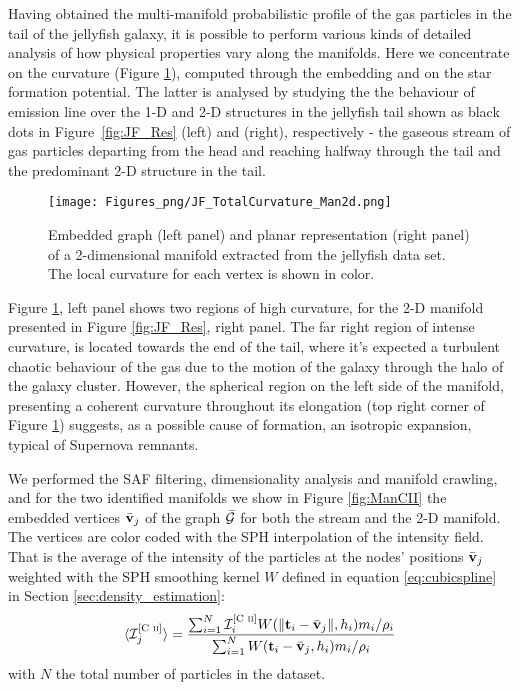 Having obtained the multi-manifold probabilistic profile of the gas particles in the tail of the jellyfish galaxy,
it is possible to perform various kinds of detailed analysis of how physical properties vary along the manifolds.
Here we concentrate on the curvature (Figure \ref{fig:curvatureJF}), computed through the embedding \citep[details in][section 3.2.1]{Canducci2021} and on the star formation potential.
The latter is analysed by studying the the behaviour of emission line \cii{} over the 1-D and 2-D structures
in the jellyfish tail shown as black dots in Figure~\ref{fig:JF_Res} (left) and (right), respectively
- the gaseous stream of gas particles departing from the head and reaching halfway through the tail and the predominant 2-D structure in the tail.
\begin{figure}[ht]
  \centering
  \texttt{[image: Figures\_png/JF\_TotalCurvature\_Man2d.png]}
  \caption{Embedded graph (left panel) and planar representation (right panel) of a 2-dimensional manifold extracted from the jellyfish data set.
  The local curvature for each vertex is shown in color.}
\label{fig:curvatureJF}
\end{figure}

Figure \ref{fig:curvatureJF}, left panel shows two regions of high curvature, for the 2-D manifold presented in Figure \ref{fig:JF_Res}, right panel.
The far right region of intense curvature, is located towards the end of the tail, where it's expected a turbulent chaotic behaviour of the gas due to the motion of the galaxy through the halo of the galaxy cluster.
However, the spherical region on the left side of the manifold, presenting a coherent curvature throughout its elongation (top right corner of Figure \ref{fig:curvatureJF}) suggests, as a possible cause of formation, an isotropic expansion, typical of Supernova remnants.

We performed the SAF filtering, dimensionality analysis and manifold crawling, and for the two identified manifolds we show in Figure \ref{fig:ManCII} the embedded vertices
$\bar{\boldsymbol{\mathbf{v}}}_j$ of the graph $\bar{\cal G}$
for both the stream and the 2-D manifold.
The vertices are color coded with the SPH interpolation of the \cii{} intensity field.
That is the average of the \cii{} intensity of the particles at the nodes' positions $\bar{\boldsymbol{\mathbf{v}}}_j$ weighted with the SPH smoothing kernel $W$ defined in equation \eqref{eq:cubicspline} in Section \ref{sec:density_estimation}:
\begin{equation}\label{eq:WeightedVar}
  \langle\mathcal{I}^{\text{[C~\textsc{ii}]{}}}_j\rangle = \frac{\sum_{i=1}^{N} \mathcal{I}^{\text{[C~\textsc{ii}]{}}}_i W (\norm{\boldsymbol{\mathbf{t}}_i - \bar{\boldsymbol{\mathbf{v}}}_j}, h_i) m_i/\rho_i }{\sum_{i=1}^{N} W ({\boldsymbol{\mathbf{t}}_i - \bar{\boldsymbol{\mathbf{v}}}_j}, h_i) m_i/ \rho_i}
\end{equation}
with $N$ the total number of particles in the dataset.

